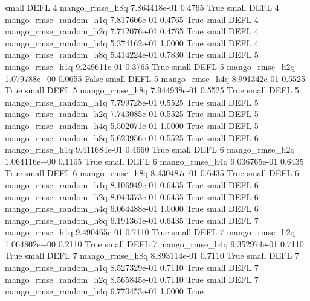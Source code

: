      small     DEFL                 4        mango_rmse_h8q 7.864418e-01      0.4765    True
     small     DEFL                 4 mango_rmse_random_h1q 7.817606e-01      0.4765    True
     small     DEFL                 4 mango_rmse_random_h2q 7.712076e-01      0.4765    True
     small     DEFL                 4 mango_rmse_random_h4q 5.374162e-01      1.0000    True
     small     DEFL                 4 mango_rmse_random_h8q 5.414224e-01      0.7830    True
     small     DEFL                 5        mango_rmse_h1q 9.249611e-01      0.3765    True
     small     DEFL                 5        mango_rmse_h2q 1.079788e+00      0.0655   False
     small     DEFL                 5        mango_rmse_h4q 8.991342e-01      0.5525    True
     small     DEFL                 5        mango_rmse_h8q 7.944938e-01      0.5525    True
     small     DEFL                 5 mango_rmse_random_h1q 7.799728e-01      0.5525    True
     small     DEFL                 5 mango_rmse_random_h2q 7.743085e-01      0.5525    True
     small     DEFL                 5 mango_rmse_random_h4q 5.502071e-01      1.0000    True
     small     DEFL                 5 mango_rmse_random_h8q 5.623956e-01      0.5525    True
     small     DEFL                 6        mango_rmse_h1q 9.411684e-01      0.4660    True
     small     DEFL                 6        mango_rmse_h2q 1.064116e+00      0.1105    True
     small     DEFL                 6        mango_rmse_h4q 9.036765e-01      0.6435    True
     small     DEFL                 6        mango_rmse_h8q 8.430487e-01      0.6435    True
     small     DEFL                 6 mango_rmse_random_h1q 8.106949e-01      0.6435    True
     small     DEFL                 6 mango_rmse_random_h2q 8.043373e-01      0.6435    True
     small     DEFL                 6 mango_rmse_random_h4q 6.064488e-01      1.0000    True
     small     DEFL                 6 mango_rmse_random_h8q 6.191361e-01      0.6435    True
     small     DEFL                 7        mango_rmse_h1q 9.490465e-01      0.7110    True
     small     DEFL                 7        mango_rmse_h2q 1.064802e+00      0.2110    True
     small     DEFL                 7        mango_rmse_h4q 9.352974e-01      0.7110    True
     small     DEFL                 7        mango_rmse_h8q 8.893114e-01      0.7110    True
     small     DEFL                 7 mango_rmse_random_h1q 8.527329e-01      0.7110    True
     small     DEFL                 7 mango_rmse_random_h2q 8.565845e-01      0.7110    True
     small     DEFL                 7 mango_rmse_random_h4q 6.770453e-01      1.0000    True
